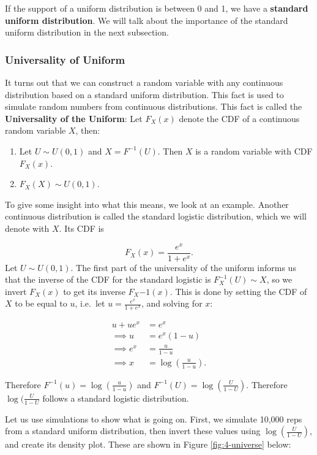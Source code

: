\documentclass[
]{book}
\providecommand{\tightlist}{%
  \setlength{\itemsep}{0pt}\setlength{\parskip}{0pt}}
\begin{document}
If the support of a uniform distribution is between 0 and 1, we have a \textbf{standard uniform distribution}. We will talk about the importance of the standard uniform distribution in the next subsection.

\subsubsection{Universality of Uniform}\label{universality-of-uniform}

It turns out that we can construct a random variable with any continuous distribution based on a standard uniform distribution. This fact is used to simulate random numbers from continuous distributions. This fact is called the \textbf{Universality of the Uniform}: Let \(F_X(x)\) denote the CDF of a continuous random variable \(X\), then:

\begin{enumerate}
\def\labelenumi{\arabic{enumi}.}
\tightlist
\item
  Let \(U \sim U(0,1)\) and \(X = F^{-1}(U)\). Then \(X\) is a random variable with CDF \(F_X(x)\).
\item
  \(F_X(X) \sim U(0,1)\).
\end{enumerate}

To give some insight into what this means, we look at an example. Another continuous distribution is called the standard logistic distribution, which we will denote with \(X\). Its CDF is

\[
F_X(x) = \frac{e^x}{1+e^x}.
\]
Let \(U \sim U(0,1)\). The first part of the universality of the uniform informs us that the inverse of the CDF for the standard logistic is \(F_X^{-1}(U) \sim X\), so we invert \(F_X(x)\) to get its inverse \(F_X{-1}(x)\). This is done by setting the CDF of \(X\) to be equal to \(u\), i.e.~let \(u = \frac{e^x}{1+e^x}\), and solving for \(x\):

\[
\begin{split}
u + u e^x &= e^x\\
\implies u &= e^x (1-u) \\
\implies e^x &= \frac{u}{1-u} \\
\implies x &= \log (\frac{u}{1-u}).
\end{split}
\]

Therefore \(F^{-1}(u) = \log (\frac{u}{1-u})\) and \(F^{-1}(U) = \log (\frac{U}{1-U})\). Therefore \(\log (\frac{U}{1-U}\) follows a standard logistic distribution.

Let us use simulations to show what is going on. First, we simulate 10,000 reps from a standard uniform distribution, then invert these values using \(\log (\frac{U}{1-U})\), and create its density plot. These are shown in Figure \ref{fig:4-universe} below:
\end{document}
